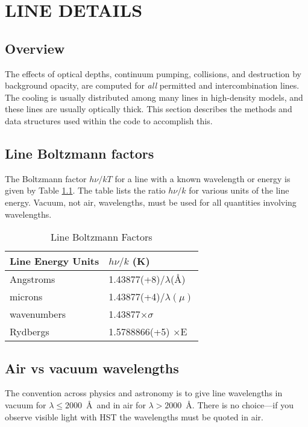 \chapter{LINE DETAILS }

\section{Overview }

The effects of optical depths, continuum pumping, collisions, and
destruction by background opacity,
are computed for \emph{all} permitted and
intercombination lines.
The cooling is usually distributed among many lines
in high-density models, and these lines are usually optically thick.   This
section describes the methods and data structures used within the code to
accomplish this.

\section{Line Boltzmann factors }

The Boltzmann factor $h\nu/kT$ for a line with a known wavelength or
energy is given by Table \ref{tab:LineBoltzmann}.
The table lists the ratio $h\nu/k$ for various units of
the line energy.
Vacuum, not air, wavelengths, must be used for all
quantities involving wavelengths.

\begin{table}
\centering
\caption{\label{tab:LineBoltzmann}Line Boltzmann Factors }
\begin{tabular}{ll}
\hline
Line Energy Units& $h\nu/k$ (K)\\
\hline
 Angstroms& 1.43877(+8)/$\lambda$(\AA)\\
microns& 1.43877(+4)/$\lambda(\mu)$\\
 wavenumbers& 1.43877$\times \sigma$\\
 Rydbergs& 1.5788866(+5) $\times$E\\
\hline
\end{tabular}
\end{table}

\section{Air vs vacuum wavelengths }

The convention across physics and astronomy is to give line wavelengths
in vacuum for $\lambda\le 2000$~\AA\ and in air for $\lambda > 2000$~\AA.
There is no choice---if you observe visible light with
HST the wavelengths must be quoted in air.

